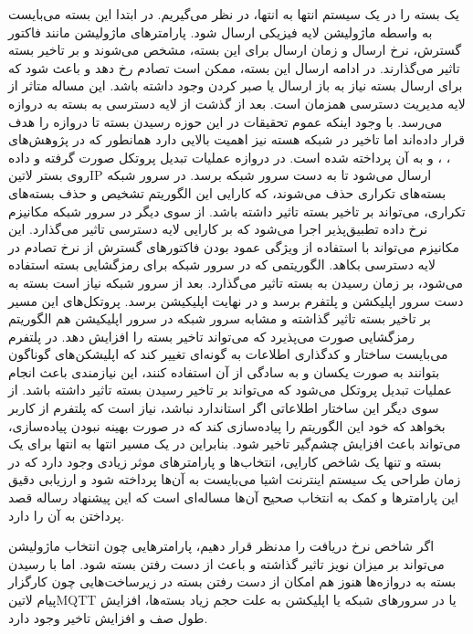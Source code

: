 یک بسته را در یک سیستم انتها به انتها، در نظر می‌گیریم. در ابتدا این بسته می‌بایست به واسطه ماژولیشن لایه فیزیکی ارسال شود.
پارامترهای ماژولیشن مانند فاکتور گسترش، نرخ ارسال و زمان ارسال برای این بسته، مشخص می‌شوند و بر تاخیر بسته تاثیر می‌گذارند.
در ادامه ارسال این بسته، ممکن است تصادم رخ دهد و باعث شود که برای ارسال بسته نیاز به باز ارسال
یا صبر کردن وجود داشته باشد. این مساله متاثر از لایه مدیریت دسترسی همزمان است. بعد از گذشت از لایه دسترسی به بسته به دروازه
می‌رسد.
با وجود اینکه عموم تحقیقات در این حوزه رسیدن بسته تا دروازه را هدف قرار داده‌اند اما تاخیر در شبکه هسته نیز اهمیت بالایی
دارد همانطور که در پژوهش‌های ، ،  و  به آن پرداخته شده است.
در دروازه عملیات تبدیل پروتکل صورت گرفته و داده روی بستر ‌لاتین{IP} ارسال می‌شود تا به دست سرور شبکه برسد.
در سرور شبکه بسته‌های تکراری حذف می‌شوند، که کارایی این الگوریتم تشخیص و حذف بسته‌های تکراری، می‌تواند بر تاخیر بسته تاثیر داشته باشد. از سوی دیگر در سرور شبکه
مکانیزم نرخ داده تطبیق‌پذیر اجرا می‌شود که بر کارایی لایه دسترسی تاثیر می‌گذارد. این مکانیزم می‌تواند با استفاده از ویژگی عمود بودن فاکتورهای گسترش
از نرخ تصادم در لایه دسترسی بکاهد. الگوریتمی که در سرور شبکه برای رمزگشایی بسته استفاده می‌شود، بر زمان رسیدن به بسته تاثیر می‌گذارد.
بعد از سرور شبکه نیاز است بسته به دست سرور اپلیکشن و پلتفرم برسد و در نهایت اپلیکیشن برسد. پروتکل‌های این مسیر بر تاخیر بسته تاثیر گذاشته
و مشابه سرور شبکه در سرور اپلیکیشن هم الگوریتم رمزگشایی صورت می‌پذیرد که می‌تواند تاخیر بسته را افزایش دهد.
در پلتفرم می‌بایست ساختار و کدگذاری اطلاعات به گونه‌ای تغییر کند که اپلیشکن‌های گوناگون بتوانند به صورت یکسان و به سادگی از آن استفاده کنند،
این نیازمندی باعث انجام عملیات تبدیل پروتکل می‌شود که می‌تواند بر تاخیر رسیدن بسته تاثیر داشته باشد. از سوی دیگر این ساختار اطلاعاتی
اگر استاندارد نباشد، نیاز است که پلتفرم از کاربر بخواهد که خود این الگوریتم را پیاده‌سازی کند که در صورت بهینه نبودن پیاده‌سازی، می‌تواند باعث
افزایش چشم‌گیر تاخیر شود.
بنابراین در یک مسیر انتها به انتها برای یک بسته و تنها یک شاخص کارایی، انتخاب‌ها و پارامترهای موثر زیادی وجود دارد
که در زمان طراحی یک سیستم اینترنت اشیا می‌بایست به آن‌ها پرداخته شود و ارزیابی دقیق این پارامترها و کمک به انتخاب صحیح آن‌ها
مساله‌ای است که این پیشنهاد رساله قصد پرداختن به آن را دارد.

اگر شاخص نرخ دریافت را مدنظر قرار دهیم، پارامترهایی چون انتخاب ماژولیشن می‌تواند بر میزان نویز تاثیر گذاشته و باعث از دست رفتن بسته شود.
اما با رسیدن بسته به دروازه‌ها هنوز هم امکان از دست رفتن بسته در زیرساخت‌هایی چون کارگزار پیام ‌لاتین{MQTT} یا در سرورهای
شبکه یا اپلیکشن به علت حجم زیاد بسته‌ها، افزایش طول صف و افزایش تاخیر وجود دارد.

